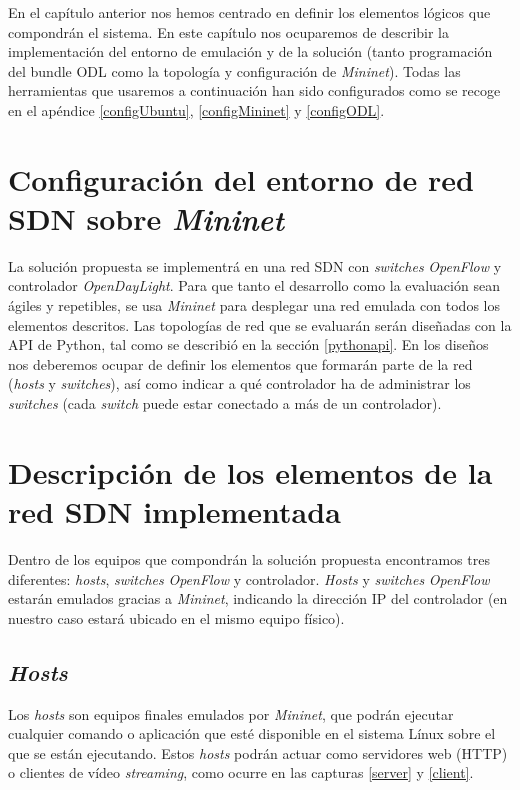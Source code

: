 \documentclass[a4paper,11pt]{book}
\begin{document}
En el capítulo anterior nos hemos centrado en definir los elementos lógicos que compondrán el sistema. En este capítulo nos ocuparemos de describir la implementación del entorno de emulación y de la solución (tanto programación del bundle \ac{ODL} como la topología y configuración de \emph{Mininet}). Todas las herramientas que usaremos a continuación han sido configurados como se recoge en el apéndice \ref{configUbuntu}, \ref{configMininet} y \ref{configODL}.
 

\section{Configuración del entorno de red SDN sobre \emph{Mininet}}

 La solución propuesta se implementrá en una red SDN con \textit{switches} \emph{OpenFlow} y controlador \emph{OpenDayLight}. Para que tanto el desarrollo como la evaluación sean ágiles y repetibles, se usa \emph{Mininet} para desplegar una red emulada con todos los elementos descritos.
 Las topologías de red que se evaluarán serán diseñadas con la \ac{API} de Python, tal como se describió en la sección \ref{pythonapi}. En los diseños nos deberemos ocupar de definir los elementos que formarán parte de la red (\textit{hosts} y \textit{switches}), así como indicar a qué controlador ha de administrar los \textit{switches} (cada \textit{switch} puede estar conectado a más de un controlador).
 
\section{Descripción de los elementos de la red \ac{SDN} implementada}

Dentro de los equipos que compondrán la solución propuesta encontramos tres diferentes: \textit{hosts}, \textit{switches} \emph{OpenFlow} y controlador. \textit{Hosts} y \textit{switches} \emph{OpenFlow} estarán emulados gracias a \emph{Mininet}, indicando la dirección \ac{IP} del controlador (en nuestro caso estará ubicado en el mismo equipo físico). 

\subsection{\textit{Hosts}}
Los \textit{hosts} son equipos finales emulados por \emph{Mininet}, que podrán ejecutar cualquier comando o aplicación que esté disponible en el sistema Línux sobre el que se están ejecutando. Estos \textit{hosts} podrán actuar como servidores web (\ac{HTTP}) o clientes de vídeo \textit{streaming}, como ocurre en las capturas \ref{server} y \ref{client}.
\end{document}
